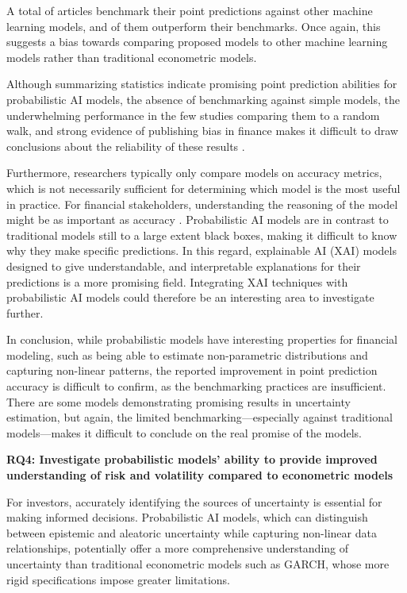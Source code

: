 A total of \pointpredMLbench articles benchmark their point predictions against other machine learning models, and \pointpredMLbenchoutp of them outperform their benchmarks. Once again, this suggests a bias towards comparing proposed models to other machine learning models rather than traditional econometric models.

Although summarizing statistics indicate promising point prediction abilities for probabilistic AI models, the absence of benchmarking against simple models, the underwhelming performance in the few studies comparing them to a random walk, and strong evidence of publishing bias in finance makes it difficult to draw conclusions about the reliability of these results \parencite{Kim2015SignificanceTI}.

Furthermore, researchers typically only compare models on accuracy metrics, which is not necessarily sufficient for determining which model is the most useful in practice. For financial stakeholders, understanding the reasoning of the model might be as important as accuracy \parencite{Freeborough2022}. Probabilistic AI models are in contrast to traditional models still to a large extent black boxes, making it difficult to know why they make specific predictions. In this regard, explainable AI (XAI) models designed to give understandable, and interpretable explanations for their predictions is a more promising field. Integrating XAI techniques with probabilistic AI models could therefore be an interesting area to investigate further.

In conclusion, while probabilistic models have interesting properties for financial modeling, such as being able to estimate non-parametric distributions and capturing non-linear patterns, the reported improvement in point prediction accuracy is difficult to confirm, as the benchmarking practices are insufficient. There are some models demonstrating promising results in uncertainty estimation, but again, the limited benchmarking—especially against traditional models—makes it difficult to conclude on the real promise of the models.

\textbf{RQ4: Investigate probabilistic models' ability to provide improved understanding of risk and volatility compared to econometric models}\nopagebreak

For investors, accurately identifying the sources of uncertainty is essential for making informed decisions. Probabilistic AI models, which can distinguish between epistemic and aleatoric uncertainty while capturing non-linear data relationships, potentially offer a more comprehensive understanding of uncertainty than traditional econometric models such as GARCH, whose more rigid specifications impose greater limitations.

